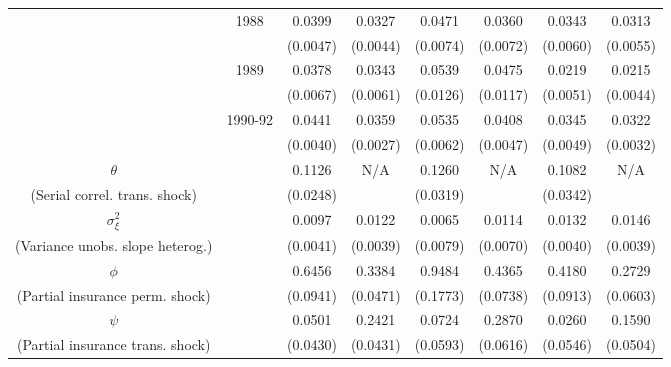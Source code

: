 \begin{table}[htbp]
\begin{center}
{\begin{tabular}{cccc|cc|cc}
\\  & 1988 & 0.0399 &   0.0327 & 0.0471 &   0.0360 & 0.0343 &   0.0313
\\  &                    & (0.0047) & (0.0044)  & (0.0074) & (0.0072)  & (0.0060) & (0.0055) 
\\  & 1989 & 0.0378 &   0.0343 & 0.0539 &   0.0475 & 0.0219 &   0.0215
\\  &                    & (0.0067) & (0.0061)  & (0.0126) & (0.0117)  & (0.0051) & (0.0044) 
\\  & 1990-92 & 0.0441 &   0.0359 & 0.0535 &   0.0408 & 0.0345 &   0.0322 
\\  &         & (0.0040) & (0.0027) & (0.0062) & (0.0047) & (0.0049) & (0.0032) 
\\ \hline  
 $\theta$ &     & 0.1126 &   N/A & 0.1260 &   N/A & 0.1082 &   N/A 
\\ (Serial correl. trans. shock) &     & (0.0248) &  & (0.0319) &  & (0.0342) &  
\\ $\sigma^2_{\xi}$ &     & 0.0097 &   0.0122 & 0.0065 &   0.0114 & 0.0132 &   0.0146 
\\ (Variance unobs. slope heterog.) &     & (0.0041) & (0.0039) & (0.0079) & (0.0070) & (0.0040) & (0.0039) 
\\ \hline  
 $\phi$ &     & 0.6456 &   0.3384 & 0.9484 &   0.4365 & 0.4180 &   0.2729 
\\ (Partial insurance perm. shock) &     & (0.0941) & (0.0471) & (0.1773) & (0.0738) & (0.0913) & (0.0603) 
\\ $\psi$ &     & 0.0501 &   0.2421 & 0.0724 &   0.2870 & 0.0260 &   0.1590 
\\ (Partial insurance trans. shock) &     & (0.0430) & (0.0431) & (0.0593) & (0.0616) & (0.0546) & (0.0504) 
\\ \hline  
 \end{tabular}   
 } 
 \usebox{\ReplicationTable}  
\settowidth\TableWidth{\usebox{\ReplicationTable}} %
\end{center}  
\end{table}  
